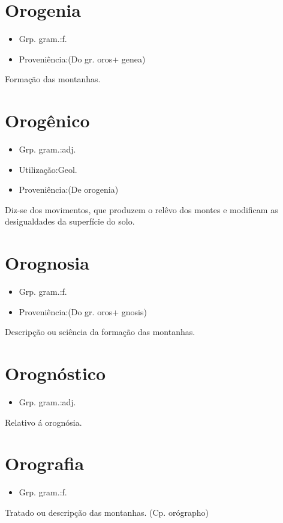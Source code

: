 \section{Orogenia}
\begin{itemize}
\item {Grp. gram.:f.}
\end{itemize}
\begin{itemize}
\item {Proveniência:(Do gr. \textunderscore oros\textunderscore  + \textunderscore genea\textunderscore )}
\end{itemize}
Formação das montanhas.
\section{Orogênico}
\begin{itemize}
\item {Grp. gram.:adj.}
\end{itemize}
\begin{itemize}
\item {Utilização:Geol.}
\end{itemize}
\begin{itemize}
\item {Proveniência:(De \textunderscore orogenia\textunderscore )}
\end{itemize}
Diz-se dos movimentos, que produzem o relêvo dos montes e modificam as desigualdades da superfície do solo.
\section{Orognosia}
\begin{itemize}
\item {Grp. gram.:f.}
\end{itemize}
\begin{itemize}
\item {Proveniência:(Do gr. \textunderscore oros\textunderscore  + \textunderscore gnosis\textunderscore )}
\end{itemize}
Descripção ou sciência da formação das montanhas.
\section{Orognóstico}
\begin{itemize}
\item {Grp. gram.:adj.}
\end{itemize}
Relativo á orognósia.
\section{Orografia}
\begin{itemize}
\item {Grp. gram.:f.}
\end{itemize}
Tratado ou descripção das montanhas.
(Cp. \textunderscore orógrapho\textunderscore )
